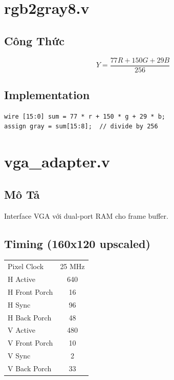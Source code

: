 \documentclass[12pt,a4paper]{article}
\begin{document}
\section{rgb2gray8.v}

\subsection{Công Thức}
\begin{equation}
Y = \frac{77R + 150G + 29B}{256}
\end{equation}

\subsection{Implementation}
\begin{lstlisting}
wire [15:0] sum = 77 * r + 150 * g + 29 * b;
assign gray = sum[15:8];  // divide by 256
\end{lstlisting}

\section{vga\_adapter.v}

\subsection{Mô Tả}
Interface VGA với dual-port RAM cho frame buffer.

\subsection{Timing (160x120 upscaled)}
\begin{table}[h]
\centering
\begin{tabular}{|l|c|}
\hline
Pixel Clock & 25 MHz \\
H Active & 640 \\
H Front Porch & 16 \\
H Sync & 96 \\
H Back Porch & 48 \\
V Active & 480 \\
V Front Porch & 10 \\
V Sync & 2 \\
V Back Porch & 33 \\
\hline
\end{tabular}
\end{table}
\end{document}
